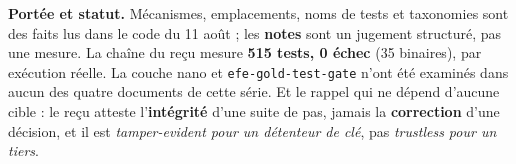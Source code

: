 \documentclass[10pt]{article}
\newcommand{\sz}[1]{{\small\color{grey}\textsf{#1}}}
\newcommand{\code}[1]{\texttt{\small #1}}
\begin{document}
\begin{these}
\small\textbf{Portée et statut.} Mécanismes, emplacements, noms de tests et taxonomies sont des faits
lus dans le code du 11 août ; les \textbf{notes} sont un jugement structuré, pas une mesure. La chaîne
du reçu mesure \textbf{515 tests, 0 échec} \sz{(35 binaires)}, par exécution réelle. La couche nano et
\code{efe-gold-test-gate} n'ont été examinés dans aucun des quatre documents de cette série. Et le
rappel qui ne dépend d'aucune cible : le reçu atteste l'\textbf{intégrité} d'une suite de pas, jamais
la \textbf{correction} d'une décision, et il est \emph{tamper-evident pour un détenteur de clé}, pas
\emph{trustless pour un tiers}.
\end{these}
\end{document}
